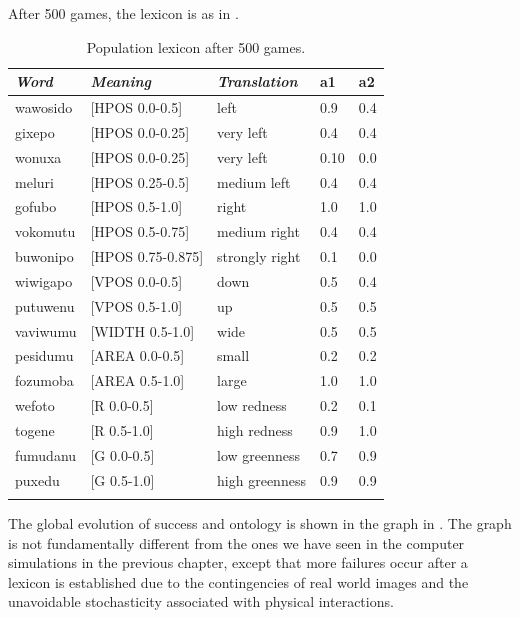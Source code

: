 After 500 games, the lexicon is as in . 
\begin{table}
\begin{center}
\begin{tabular}{ l  l  l  l  l }
\lsptoprule
{\itshape Word}&{\itshape Meaning}&{\itshape Translation} & {\bfshape a1}&{\bfshape a2} \\ \midrule
wawosido & [HPOS 0.0-0.5] &left&0.9&0.4\\ 
gixepo & [HPOS 0.0-0.25] & very left&0.4&0.4\\ 
wonuxa & [HPOS 0.0-0.25] & very left&0.10&0.0\\ 
meluri & [HPOS 0.25-0.5] &medium left&0.4&0.4\\ 
gofubo & [HPOS 0.5-1.0]& right&1.0&1.0\\ 
vokomutu & [HPOS 0.5-0.75] &medium right&0.4&0.4\\ 
buwonipo & [HPOS 0.75-0.875] &strongly right&0.1&0.0\\ 
wiwigapo & [VPOS 0.0-0.5] &down&0.5&0.4\\ 
putuwenu & [VPOS 0.5-1.0]&up & 0.5&0.5\\ 
vaviwumu & [WIDTH 0.5-1.0]&wide & 0.5&0.5\\ 
pesidumu & [AREA 0.0-0.5]&small& 0.2&0.2\\ 
fozumoba & [AREA 0.5-1.0]&large & 1.0&1.0\\ 
wefoto & [R 0.0-0.5]& low redness &0.2&0.1\\ 
togene & [R 0.5-1.0]& high redness &0.9&1.0\\ 
fumudanu & [G 0.0-0.5]& low greenness &0.7&0.9\\ 
puxedu & [G 0.5-1.0]& high greenness &0.9&0.9\\ 
\lspbottomrule
\end{tabular}
\caption{ \label{tab:puxedu} Population lexicon after 500 games.}
\end{center}
\end{table}
The global evolution of success and ontology is shown in the 
graph in . The graph is not 
fundamentally different from the ones we have
seen in the computer simulations in the previous
chapter, except that more failures occur after a lexicon
is established due to the contingencies of real 
world images and the unavoidable stochasticity 
associated with physical interactions. 
